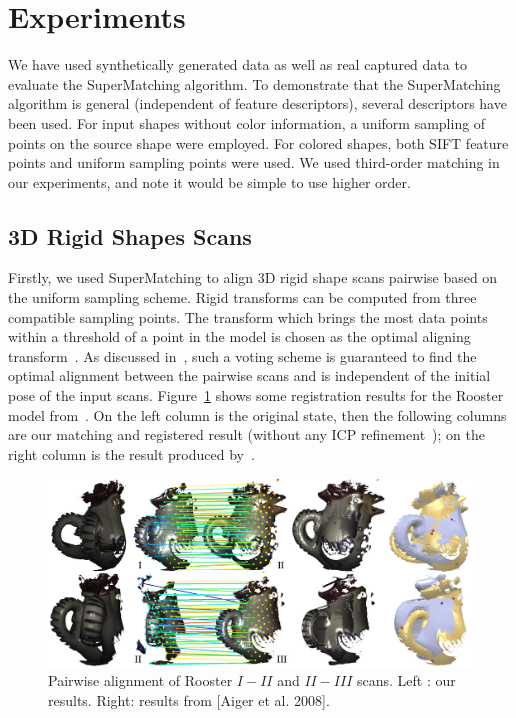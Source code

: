 \section{Experiments}
\label{sec:experiments}

We have used synthetically generated data as well as real captured data to evaluate the SuperMatching algorithm.
To demonstrate that the SuperMatching algorithm is general (independent of feature descriptors), several descriptors have been used.
For input shapes without color information, a uniform sampling of points on the source shape were employed.
For colored shapes, both SIFT feature points and uniform sampling points were used.
We used third-order matching in our experiments, and note it would be simple to use higher order.

\subsection{3D Rigid Shapes Scans}
\label{subsec:3DRigid}

Firstly, we used SuperMatching to align 3D rigid shape scans pairwise based on the uniform sampling scheme.
Rigid transforms can be computed from three compatible sampling points.
The transform which brings the most data points within a threshold of a point in the model is chosen as the optimal aligning transform~\cite{Huttenlocher90}.
As discussed in~\cite{Gelfand05}, such a voting scheme is guaranteed to find the optimal alignment between the pairwise scans and is independent of the initial pose of the input scans.
Figure~\ref{fig:3DPair} shows some registration results for the Rooster model from~\cite{Chuang09}. On the left column is the original state,
then the following columns are our matching and registered result (without any ICP refinement~\cite{Besl92}); on the right column is the result produced by~\cite{Aiger08}.

\begin{figure}[htb]
\centering
  \includegraphics[width=0.99\linewidth]{figures/RoosterPair.pdf}
  \caption{Pairwise alignment of Rooster \emph{$I-II$} and \emph{$II-III$} scans. Left : our results. Right: results from [Aiger et al. 2008].}
\label{fig:3DPair}
\end{figure}

